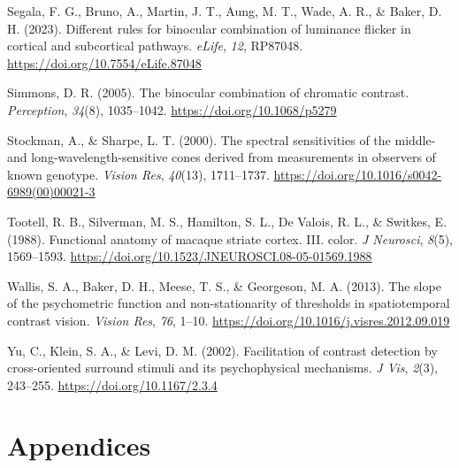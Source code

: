 \documentclass[
]{article}
\newlength{\cslhangindent}
\newlength{\cslentryspacingunit} %
\newenvironment{CSLReferences}[2] %
 {%
  \setlength{\parindent}{0pt}
  \ifodd #1
  \let\oldpar\par
  \def\par{\hangindent=\cslhangindent\oldpar}
  \fi
  \setlength{\parskip}{#2\cslentryspacingunit}
 }%
 {}
\begin{document}
\begin{CSLReferences}{1}{0}
\leavevmode{}%
Segala, F. G., Bruno, A., Martin, J. T., Aung, M. T., Wade, A. R., \& Baker, D. H. (2023). Different rules for binocular combination of luminance flicker in cortical and subcortical pathways. \emph{eLife}, \emph{12}, RP87048. \url{https://doi.org/10.7554/eLife.87048}

\leavevmode{}%
Simmons, D. R. (2005). The binocular combination of chromatic contrast. \emph{Perception}, \emph{34}(8), 1035--1042. \url{https://doi.org/10.1068/p5279}

\leavevmode{}%
Stockman, A., \& Sharpe, L. T. (2000). The spectral sensitivities of the middle- and long-wavelength-sensitive cones derived from measurements in observers of known genotype. \emph{Vision Res}, \emph{40}(13), 1711--1737. \url{https://doi.org/10.1016/s0042-6989(00)00021-3}

\leavevmode{}%
Tootell, R. B., Silverman, M. S., Hamilton, S. L., De Valois, R. L., \& Switkes, E. (1988). Functional anatomy of macaque striate cortex. III. color. \emph{J Neurosci}, \emph{8}(5), 1569--1593. \url{https://doi.org/10.1523/JNEUROSCI.08-05-01569.1988}

\leavevmode{}%
Wallis, S. A., Baker, D. H., Meese, T. S., \& Georgeson, M. A. (2013). The slope of the psychometric function and non-stationarity of thresholds in spatiotemporal contrast vision. \emph{Vision Res}, \emph{76}, 1--10. \url{https://doi.org/10.1016/j.visres.2012.09.019}

\leavevmode{}%
Yu, C., Klein, S. A., \& Levi, D. M. (2002). Facilitation of contrast detection by cross-oriented surround stimuli and its psychophysical mechanisms. \emph{J Vis}, \emph{2}(3), 243--255. \url{https://doi.org/10.1167/2.3.4}

\end{CSLReferences}

\hypertarget{appendices}{%
\section{Appendices}\label{appendices}}

\setcounter{table}{0}  \renewcommand{\thetable}{A\arabic{table}} \setcounter{figure}{0} \renewcommand{\thefigure}{A\arabic{figure}}
\end{document}
